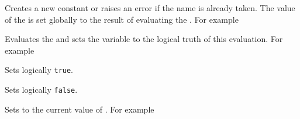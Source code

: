 \documentclass[oneside]{book}
\begin{document}
\begin{function}{\BoolConst}
\begin{syntax}
  
\end{syntax}
Creates a new constant  or raises an error if the name
is already taken. The value of the  is set globally to
the result of evaluating the .
For example
\begin{codehigh}
\BoolConst {}
\BoolVarLog \cFooSomeBool
\end{codehigh}
\end{function}

\begin{function}{\BoolSet}
\begin{syntax}
  
\end{syntax}
Evaluates the  and sets the  variable to
the logical truth of this evaluation.
For example
\begin{codehigh}
\BoolSet {}
\BoolVarLog \lTmpaBool
\end{codehigh}
\end{function}

\begin{function}{\BoolSetTrue}
\begin{syntax}
 
\end{syntax}
Sets  logically \texttt{true}.
\end{function}

\begin{function}{\BoolSetFalse}
\begin{syntax}
 
\end{syntax}
Sets  logically \texttt{false}.
\end{function}

\begin{function}{\BoolSetEq}
\begin{syntax}
  
\end{syntax}
Sets  to the current value of .
For example
\begin{codehigh}
\BoolSetTrue \lTmpaBool
\BoolSetEq \lTmpbBool \lTmpaBool
\BoolVarLog \lTmpbBool
\end{codehigh}
\end{function}
\end{document}
